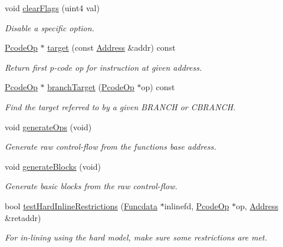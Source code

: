 \begin{DoxyCompactItemize}
void \mbox{\hyperlink{class_flow_info_a9484944b8fee15fc9a85ce26c4f878ae}{clear\+Flags}} (uint4 val)
\begin{DoxyCompactList}\small\item\em Disable a specific option. \end{DoxyCompactList}\item 
\mbox{\hyperlink{class_pcode_op}{Pcode\+Op}} $\ast$ \mbox{\hyperlink{class_flow_info_a79b96fb0e47a98e97da11975f9fd5e0b}{target}} (const \mbox{\hyperlink{class_address}{Address}} \&addr) const
\begin{DoxyCompactList}\small\item\em Return first p-\/code op for instruction at given address. \end{DoxyCompactList}\item 
\mbox{\hyperlink{class_pcode_op}{Pcode\+Op}} $\ast$ \mbox{\hyperlink{class_flow_info_a85b5e5174e678b9a0bf451fba51a4019}{branch\+Target}} (\mbox{\hyperlink{class_pcode_op}{Pcode\+Op}} $\ast$op) const
\begin{DoxyCompactList}\small\item\em Find the target referred to by a given B\+R\+A\+N\+CH or C\+B\+R\+A\+N\+CH. \end{DoxyCompactList}\item 
void \mbox{\hyperlink{class_flow_info_afe680152d016a3ec80e155f3ea85f26c}{generate\+Ops}} (void)
\begin{DoxyCompactList}\small\item\em Generate raw control-\/flow from the function\textquotesingle{}s base address. \end{DoxyCompactList}\item 
void \mbox{\hyperlink{class_flow_info_a5c8f51cb6c88719657801a2f26e87fae}{generate\+Blocks}} (void)
\begin{DoxyCompactList}\small\item\em Generate basic blocks from the raw control-\/flow. \end{DoxyCompactList}\item 
bool \mbox{\hyperlink{class_flow_info_a7ce3b6b33fb219117c69700e32b0c1ef}{test\+Hard\+Inline\+Restrictions}} (\mbox{\hyperlink{class_funcdata}{Funcdata}} $\ast$inlinefd, \mbox{\hyperlink{class_pcode_op}{Pcode\+Op}} $\ast$op, \mbox{\hyperlink{class_address}{Address}} \&retaddr)
\begin{DoxyCompactList}\small\item\em For in-\/lining using the {\itshape hard} model, make sure some restrictions are met. \end{DoxyCompactList}\item 

\end{DoxyCompactItemize}
